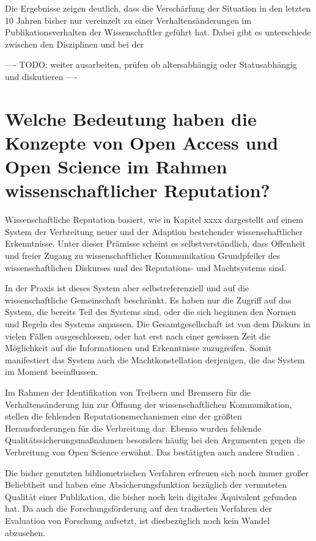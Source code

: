 Die Ergebnisse zeigen deutlich, dass die Verschärfung der Situation in den letzten 10 Jahren bisher nur vereinzelt zu einer Verhaltensänderungen im Publikationsverhalten der Wissenschaftler geführt hat. Dabei gibt es unterschiede zwischen den Disziplinen und bei der

---- TODO: weiter ausarbeiten, prüfen ob altersabhängig oder Statusabhängig und diskutieren ----

\section{Welche Bedeutung haben die Konzepte von Open Access und Open Science im Rahmen wissenschaftlicher Reputation?}

Wissenschaftliche Reputation basiert, wie in Kapitel xxxx dargestellt auf einem System der Verbreitung neuer und der Adaption bestehender wissenschaftlicher Erkenntnisse. Unter dieser Prämisse scheint es selbstverständlich, dass Offenheit und freier Zugang zu wissenschaftlicher Kommunikation Grundpfeiler des wissenschaftlichen Diskurses und des Reputations- und Machtsystems sind.

In der Praxis ist dieses System aber selbstreferenziell und auf die wissenschaftliche Gemeinschaft beschränkt. Es haben nur die Zugriff auf das System, die bereits Teil des Systems sind, oder die sich beginnen den Normen und Regeln des Systems anpassen. Die Gesamtgesellschaft ist von dem Diskurs in vielen Fällen ausgeschlossen, oder hat erst nach einer gewissen Zeit die Möglichkeit auf die Informationen und Erkenntnisse zuzugreifen. Somit manifestiert das System auch die Machtkonstellation derjenigen, die das System im Moment beeinflussen.

Im Rahmen der Identifikation von Treibern und Bremsern für die Verhaltensänderung hin zur Öffnung der wissenschaftlichen Kommunikation, stellen die fehlenden Reputationsmechanismen eine der größten Herausforderungen für die Verbreitung dar. Ebenso wurden fehlende Qualitätssicherungsmaßnahmen besonders häufig bei den Argumenten gegen die Verbreitung von Open Science erwähnt. Das bestätigten auch andere Studien \cite{eu_open_science_2015}.

Die bisher genutzten bibliometrischen Verfahren erfreuen sich noch immer großer Beliebtheit und haben eine Absicherungsfunktion bezüglich der vermuteten Qualität einer Publikation, die bisher noch kein digitales Äquivalent gefunden hat. Da auch die Forschungsförderung auf den tradierten Verfahren der Evaluation von Forschung aufsetzt, ist diesbezüglich noch kein Wandel abzusehen.

